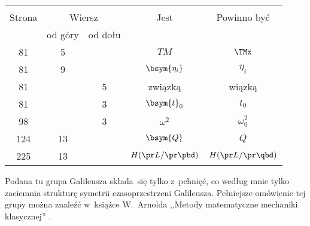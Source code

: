 \documentclass[a4paper,11pt]{article}
\begin{document}
\begin{center}
  \begin{tabular}{|c|c|c|c|c|}
    \hline
    & \multicolumn{2}{c|}{} & & \\
    Strona & \multicolumn{2}{c|}{Wiersz} & Jest
                              & Powinno być \\ \cline{2-3}
    & od góry & od dołu & & \\
    \hline
    81  &  5 & & $TM$ & $\TMx$ \\
    81  &  9 & & $\bsym{ \eta_{ i } }$ & $\eta_{ i }$ \\
    81  & &  5 & związką & wiązką \\
    81  & &  3 & $\bsym{t}_{ 0 }$ & $t_{ 0 }$ \\
    98  & &  3 & $\omega^{ 2 }$ & $\omega_{ 0 }^{ 2 }$ \\
    124 & 13 & & $\bsym{Q}$ & $Q$ \\
    225 & 13 & & $H( \pr L / \pr \pbd )$ & $H( \pr L / \pr \qbd )$ \\
    \hline
  \end{tabular}
\end{center}

\vspace{\spaceTwo}








\start {}


\vspace{\spaceTwo}








\start {} Podana tu grupa Galileusza składa~się tylko z~pchnięć,
co według mnie tylko zaciemnia strukturę symetrii czasoprzestrzeni
Galileusza. Pełniejsze omówienie tej grupy można znaleźć w~książce
W.~Arnolda ,,Metody matematyczne mechaniki klasycznej'' \cite{Arnold81}.
\end{document}
